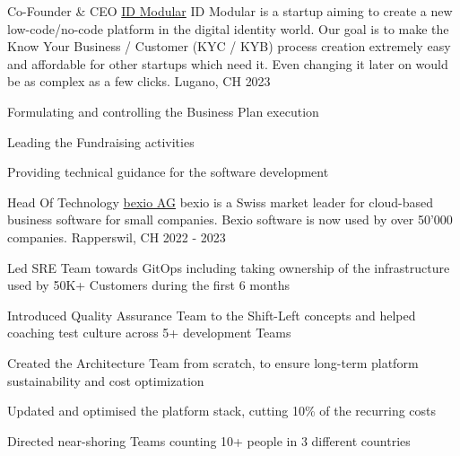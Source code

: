 \begin{cventries}
{\begin{cvitems}
    \end{cvitems}
  }
  \cventry
    {Co-Founder \& CEO} %
    {\href{https://www.idmodular.com}{ID Modular}} %
    {ID Modular is a startup aiming to create a new low-code/no-code platform in the digital identity world. Our goal is to make the Know Your Business / Customer (KYC / KYB) process creation extremely easy and affordable for other startups which need it. Even changing it later on would be as complex as a few clicks.} %
    {Lugano, CH} %
    {2023} %
    {
      \begin{cvitems} %
        \item {Formulating and controlling the Business Plan execution}
        \item {Leading the Fundraising activities}
        \item {Providing technical guidance for the software development}
      \end{cvitems}
    }
  \cventry
    {Head Of Technology} %
    {\href{https://www.bexio.com}{bexio AG}} %
    {bexio is a Swiss market leader for cloud-based business software for small companies. Bexio software is now used by over 50'000 companies.} %
    {Rapperswil, CH} %
    {2022 - 2023} %
    {
      \begin{cvitems} %
        \item {Led SRE Team towards GitOps including taking ownership of the infrastructure used by 50K+ Customers during the first 6 months}
        \item {Introduced Quality Assurance Team to the Shift-Left concepts and helped coaching test culture across 5+ development Teams}
        \item {Created the Architecture Team from scratch, to ensure long-term platform sustainability and cost optimization}
        \item {Updated and optimised the platform stack, cutting 10\% of the recurring costs}
        \item {Directed near-shoring Teams counting 10+ people in 3 different countries}
      \end{cvitems}
    }


\end{cventries}

